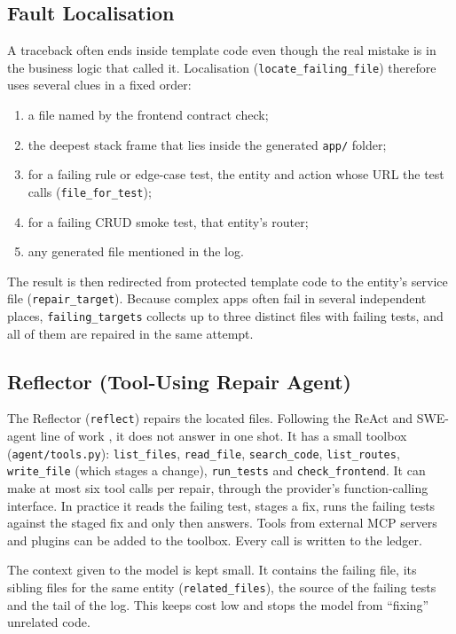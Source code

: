 \documentclass[12pt,a4paper]{report}
\begin{document}
\subsection{Fault Localisation}

A traceback often ends inside template code even though the real mistake is in the business logic that called it. Localisation (\texttt{locate\_failing\_file}) therefore uses several clues in a fixed order:
\begin{enumerate}
    \item a file named by the frontend contract check;
    \item the deepest stack frame that lies inside the generated \texttt{app/} folder;
    \item for a failing rule or edge-case test, the entity and action whose URL the test calls (\texttt{file\_for\_test});
    \item for a failing CRUD smoke test, that entity's router;
    \item any generated file mentioned in the log.
\end{enumerate}
The result is then redirected from protected template code to the entity's service file (\texttt{repair\_target}). Because complex apps often fail in several independent places, \texttt{failing\_targets} collects up to three distinct files with failing tests, and all of them are repaired in the same attempt.

\subsection{Reflector (Tool-Using Repair Agent)}

The Reflector (\texttt{reflect}) repairs the located files. Following the ReAct and SWE-agent line of work \cite{yao2023react, yang2024sweagent}, it does not answer in one shot. It has a small toolbox (\texttt{agent/tools.py}): \texttt{list\_files}, \texttt{read\_file}, \texttt{search\_code}, \texttt{list\_routes}, \texttt{write\_file} (which stages a change), \texttt{run\_tests} and \texttt{check\_frontend}. It can make at most six tool calls per repair, through the provider's function-calling interface. In practice it reads the failing test, stages a fix, runs the failing tests against the staged fix and only then answers. Tools from external MCP servers and plugins can be added to the toolbox. Every call is written to the ledger.

The context given to the model is kept small. It contains the failing file, its sibling files for the same entity (\texttt{related\_files}), the source of the failing tests and the tail of the log. This keeps cost low and stops the model from ``fixing'' unrelated code.
\end{document}
